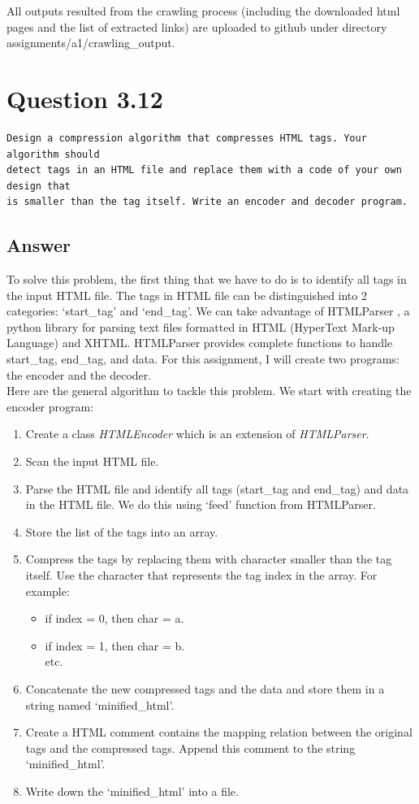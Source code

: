 \documentclass[letterpaper,11pt]{article}
\begin{document}
All outputs resulted from the crawling process (including the downloaded html pages and the list of extracted links) are uploaded to github under directory assignments/a1/crawling\_output. 

\noindent\makebox[\linewidth]{\rule{\textwidth}{0.4pt}}

\section*{Question 3.12}
\begin{verbatim}
Design a compression algorithm that compresses HTML tags. Your algorithm should
detect tags in an HTML file and replace them with a code of your own design that
is smaller than the tag itself. Write an encoder and decoder program.
\end{verbatim}

\subsection*{Answer}
To solve this problem, the first thing that we have to do is to identify all tags in the input HTML file. The tags in HTML file can be distinguished into 2 categories: `start\_tag' and `end\_tag'. We can take advantage of HTMLParser \cite{txt-compression}, a python library for parsing text files formatted in HTML (HyperText Mark-up Language) and XHTML. HTMLParser provides complete functions to handle start\_tag, end\_tag, and data. For this assignment, I will create two programs: the encoder and the decoder. \\
Here are the general algorithm to tackle this problem. We start with creating the encoder program: 
\begin{enumerate}
	\item Create a class \textit{HTMLEncoder} which is an extension of \textit{HTMLParser}. 
	\item Scan the input HTML file. 
	\item Parse the HTML file and identify all tags (start\_tag and end\_tag) and data in the HTML file. We do this using `feed' function from HTMLParser. 
	\item Store the list of the tags into an array. 
	\item Compress the tags by replacing them with character smaller than the tag itself. Use the character that represents the tag index in the array. For example: 
	\begin{itemize}
		\item if index = 0, then char = a.
		\item if index = 1, then char = b. \\
		etc.
	\end{itemize}
	\item Concatenate the new compressed tags and the data and store them in a string named `minified\_html'.
	\item Create a HTML comment contains the mapping relation between the original tags and the compressed tags. Append this comment to the string `minified\_html'. 
	\item Write down the `minified\_html' into a file. 
\end{enumerate}
	
\end{document}
